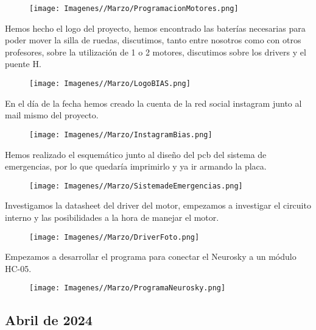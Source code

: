 \documentclass{article}
\begin{document}
\begin{figure}[H]
    \centering
    \texttt{[image: Imagenes//Marzo/ProgramacionMotores.png]}
\end{figure}

\newpage

Hemos hecho el logo del proyecto, hemos encontrado las baterías necesarias para poder mover la silla de ruedas, discutimos, tanto entre nosotros como con otros profesores, sobre la utilización de 1 o 2 motores, discutimos sobre los drivers y el puente H.

\begin{figure}[H]
    \centering
    \texttt{[image: Imagenes//Marzo/LogoBIAS.png]}
\end{figure}

En el día de la fecha hemos creado la cuenta  de la red social instagram junto al mail mismo del proyecto.

\begin{figure}[H]
    \centering
    \texttt{[image: Imagenes//Marzo/InstagramBias.png]}
\end{figure}


Hemos realizado el esquemático junto al diseño del pcb del sistema de emergencias, por lo que quedaría imprimirlo y ya ir armando la placa.

\begin{figure}[H]
    \centering
    \texttt{[image: Imagenes//Marzo/SistemadeEmergencias.png]}
\end{figure}

\newpage

Investigamos la datasheet del driver del motor, empezamos a investigar el circuito interno y las posibilidades a la hora de manejar el motor.

\begin{figure}[H]
    \centering
    \texttt{[image: Imagenes//Marzo/DriverFoto.png]}
\end{figure}

Empezamos a desarrollar el programa para conectar el Neurosky a un módulo HC-05.

\begin{figure}[H]
    \centering
    \texttt{[image: Imagenes//Marzo/ProgramaNeurosky.png]}
\end{figure}

\newpage

\begin{center}
    \section{Abril de 2024}
\end{center}
\end{document}
